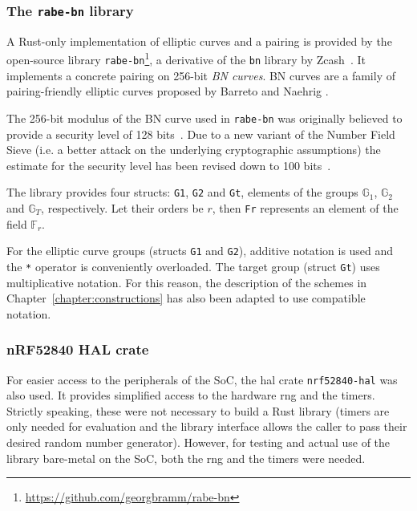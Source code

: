 \subsubsection{The \texttt{rabe-bn} library}

A Rust-only implementation of elliptic curves and a pairing is provided by the open-source library \texttt{rabe-bn}\footnote{\url{https://github.com/georgbramm/rabe-bn}}, a derivative of the \texttt{bn} library by Zcash~\cite{bowe_bn_2016}.
It implements a concrete pairing on 256-bit \emph{BN curves}. %
BN curves are a family of pairing-friendly elliptic curves proposed by Barreto and Naehrig \cite{barreto_pairing-friendly_2006}.

The 256-bit modulus of the BN curve used in \texttt{rabe-bn} was originally believed to provide a security level of 128 bits~\cite{ben-sasson_succinct_2013}. 
Due to a new variant of the Number Field Sieve (i.e. a better attack on the underlying cryptographic assumptions) the estimate for the security level has been revised down to 100 bits~\cite{yonezawa_pairing-friendly_2019}.

The library provides four structs: \texttt{G1}, \texttt{G2} and \texttt{Gt}, elements of the groups $\mathbb{G}_1$, $\mathbb{G}_2$ and $\mathbb{G}_T$, respectively.
Let their orders be $r$, then \texttt{Fr} represents an element of the field $\mathbb{F}_r$.

For the elliptic curve groups (structs \texttt{G1} and \texttt{G2}), additive notation is used and the \texttt{*} operator is conveniently overloaded.
The target group (struct \texttt{Gt}) uses multiplicative notation.
For this reason, the description of the schemes in Chapter~\ref{chapter:constructions} has also been adapted to use compatible notation.

\subsubsection{nRF52840 HAL crate}
For easier access to the peripherals of the SoC, the \acrfull{hal} \gls{crate} \texttt{nrf52840-hal} was also used.
It provides simplified access to the hardware \acrfull{rng} and the timers.
Strictly speaking, these were not necessary to build a Rust library (timers are only needed for evaluation and the library interface allows the caller to pass their desired random number generator).
However, for testing and actual use of the library bare-metal on the SoC, both the \acrshort{rng} and the timers were needed.

